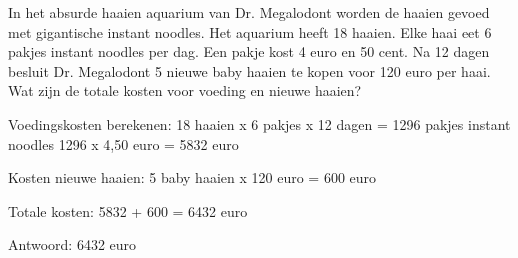 \begin{opgave}
In het absurde haaien aquarium van Dr. Megalodont worden de haaien gevoed met 
gigantische instant noodles. Het aquarium heeft 18 haaien. Elke haai eet 6 
pakjes instant noodles per dag. Een pakje kost 4 euro en 50 cent. Na 12 dagen 
besluit Dr. Megalodont 5 nieuwe baby haaien te kopen voor 120 euro per haai. 
Wat zijn de totale kosten voor voeding en nieuwe haaien?
\end{opgave}

\begin{oplossing}
Voedingskosten berekenen:
18 haaien x 6 pakjes x 12 dagen = 1296 pakjes instant noodles
1296 x 4,50 euro = 5832 euro

Kosten nieuwe haaien:
5 baby haaien x 120 euro = 600 euro

Totale kosten:
5832 + 600 = 6432 euro

Antwoord: 6432 euro
\end{oplossing}